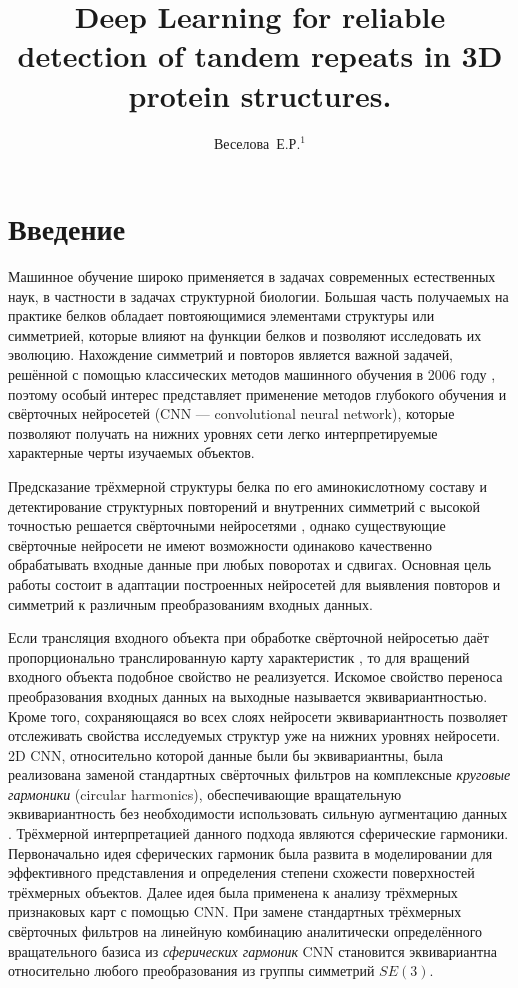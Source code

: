 \documentclass[12pt,twosides]{article}
\title
[Detection of tandem repeats in proteins]
{Deep Learning for reliable detection of tandem repeats in 3D protein structures.}
\author
[Веселова~Е.Р.] 
{Веселова~Е.Р.$^1$}
\begin{document}
	\maketitle
	
	\section{Введение}
	Машинное обучение широко применяется в задачах современных естественных наук, в частности в задачах структурной биологии. Большая часть получаемых на практике белков обладает повтояющимися элементами структуры или симметрией, которые влияют на функции белков и позволяют исследовать их эволюцию. Нахождение симметрий и повторов является важной задачей, решённой с помощью классических методов машинного обучения в 2006 году \cite{MitGuiPau06}, поэтому особый интерес представляет применение методов глубокого обучения и свёрточных нейросетей (CNN --- convolutional neural network), которые позволяют получать на нижних уровнях сети легко интерпретируемые характерные черты изучаемых объектов. 
	
	Предсказание трёхмерной структуры белка по его аминокислотному составу \cite{BioCNN18} и детектирование структурных повторений и внутренних симметрий с высокой точностью решается свёрточными нейросетями \cite{DeepSymmetry18}, однако существующие свёрточные нейросети не имеют возможности одинаково качественно обрабатывать входные данные при любых поворотах и сдвигах. Основная цель работы состоит в адаптации построенных нейросетей для выявления повторов и симметрий к различным преобразованиям входных данных. 
	
	Если трансляция входного объекта при обработке свёрточной нейросетью даёт пропорционально транслированную карту характеристик \cite{Lenc18}, то для вращений входного объекта подобное свойство не реализуется. Искомое свойство переноса преобразования входных данных на выходные называется эквивариантностью. Кроме того, сохраняющаяся во всех слоях нейросети эквивариантность позволяет отслеживать свойства исследуемых структур уже на нижних уровнях нейросети. 2D CNN, относительно которой данные были бы эквивариантны, была реализована заменой стандартных свёрточных фильтров на комплексные \textit{круговые гармоники} (circular harmonics), обеспечивающие вращательную эквивариантность без необходимости использовать сильную аугментацию данных \cite{conf/cvpr/WorrallGTB17}. Трёхмерной интерпретацией данного подхода являются сферические гармоники. Первоначально идея сферических гармоник была развита в моделировании для эффективного представления и определения степени схожести поверхностей трёхмерных объектов\cite{conf/siggraph/KazhdanF02, journals/cagd/MousaCAG08}. Далее идея была применена к анализу трёхмерных признаковых карт с помощью CNN. При замене стандартных трёхмерных свёрточных фильтров на линейную комбинацию аналитически определённого вращательного базиса из \textit{сферических гармоник} CNN становится эквивариантна относительно любого преобразования из группы симметрий $SE(3)$\cite{DBLP:journals/corr/abs-1807-02547}.
	
\end{document}
